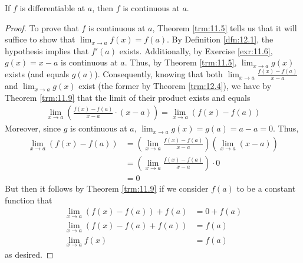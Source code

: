 \documentclass[../main.tex]{subfiles}
\begin{document}
\begin{theorem}\label{trm:12.5}
    If $f$ is differentiable at $a$, then $f$ is continuous at $a$.
    \begin{proof}
        To prove that $f$ is continuous at $a$, Theorem \ref{trm:11.5} tells us that it will suffice to show that $\lim_{x\to a}f(x)=f(a)$. By Definition \ref{dfn:12.1}, the hypothesis implies that $f'(a)$ exists. Additionally, by Exercise \ref{exr:11.6}, $g(x)=x-a$ is continuous at $a$. Thus, by Theorem \ref{trm:11.5}, $\lim_{x\to a}g(x)$ exists (and equals $g(a)$). Consequently, knowing that both $\lim_{x\to a}\frac{f(x)-f(a)}{x-a}$ and $\lim_{x\to a}g(x)$ exist (the former by Theorem \ref{trm:12.4}), we have by Theorem \ref{trm:11.9} that the limit of their product exists and equals
        \begin{align*}
            \lim_{x\to a}\left( \frac{f(x)-f(a)}{x-a}\cdot(x-a) \right) = \lim_{x\to a}(f(x)-f(a))
        \end{align*}
        Moreover, since $g$ is continuous at $a$, $\lim_{x\to a}g(x)=g(a)=a-a=0$. Thus,
        \begin{align*}
            \lim_{x\to a}(f(x)-f(a)) &= \left( \lim_{x\to a}\frac{f(x)-f(a)}{x-a} \right)\left( \lim_{x\to a}(x-a) \right)\\
            &= \left( \lim_{x\to a}\frac{f(x)-f(a)}{x-a} \right)\cdot 0\\
            &= 0
        \end{align*}
        But then it follows by Theorem \ref{trm:11.9} if we consider $f(a)$ to be a constant function that
        \begin{align*}
            \lim_{x\to a}(f(x)-f(a))+f(a) &= 0+f(a)\\
            \lim_{x\to a}(f(x)-f(a)+f(a)) &= f(a)\\
            \lim_{x\to a}f(x) &= f(a)
        \end{align*}
        as desired.
    \end{proof}
\end{theorem}
\end{document}
